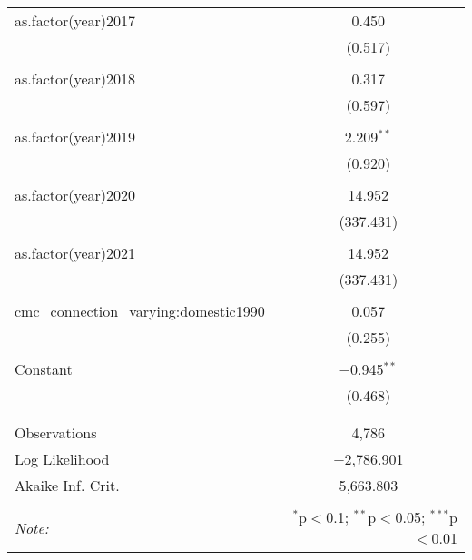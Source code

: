 \documentclass[12pt,letterpaper]{article}
\begin{document}
\begin{table}[!htbp]
{\begin{tabular}{@{\extracolsep{5pt}}lc}
		as.factor(year)2017 & 0.450 \\ 
		& (0.517) \\ 
		& \\ 
		as.factor(year)2018 & 0.317 \\ 
		& (0.597) \\ 
		& \\ 
		as.factor(year)2019 & 2.209$^{**}$ \\ 
		& (0.920) \\ 
		& \\ 
		as.factor(year)2020 & 14.952 \\ 
		& (337.431) \\ 
		& \\ 
		as.factor(year)2021 & 14.952 \\ 
		& (337.431) \\ 
		& \\ 
		cmc\_connection\_varying:domestic1990 & 0.057 \\ 
		& (0.255) \\ 
		& \\ 
		Constant & $-$0.945$^{**}$ \\ 
		& (0.468) \\ 
		& \\ 
		\hline \\[-1.8ex] 
		Observations & 4,786 \\ 
		Log Likelihood & $-$2,786.901 \\ 
		Akaike Inf. Crit. & 5,663.803 \\ 
		\hline 
		\hline \\[-1.8ex] 
		\textit{Note:}  & \multicolumn{1}{r}{$^{*}$p$<$0.1; $^{**}$p$<$0.05; $^{***}$p$<$0.01} \\ 
	\end{tabular} 
}
\end{table} 
\end{document}
